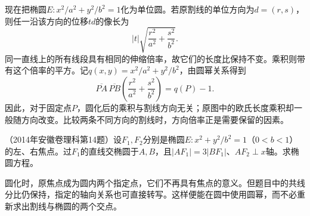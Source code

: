 现在把椭圆\(E:x^2/a^2+y^2/b^2=1\)化为单位圆。若原割线的单位方向为\(d=(r,s)\)，则任一沿该方向的位移\(t d\)的像长为
\begin{equation*}
    |t|\sqrt{\frac{r^2}{a^2}+\frac{s^2}{b^2}} .
\end{equation*}
同一直线上的所有线段具有相同的伸缩倍率，故它们的长度比保持不变。乘积则带有这个倍率的平方。记\(q(x,y)=x^2/a^2+y^2/b^2\)，由圆幂关系得到
\begin{equation}\label{eq:quadratic-ellipse-directional-power}
    \overline{PA}\,\overline{PB}
    \left(\frac{r^2}{a^2}+\frac{s^2}{b^2}\right)=q(P)-1 .
\end{equation}
因此，对于固定点\(P\)，圆化后的乘积与割线方向无关；原图中的欧氏长度乘积却一般随方向改变。比较两条不同方向的割线时，方向倍率正是需要保留的因素。

\begin{samepage}
\begin{example}\label{ex:quadratic-affine-focal-power}
（2014年安徽卷理科第14题）设\(F_1,F_2\)分别是椭圆\(E:x^2+y^2/b^2=1\)（\(0<b<1\)）的左、右焦点。过\(F_1\)的直线交椭圆于\(A,B\)，且\(|AF_1|=3|BF_1|\)、\(AF_2\perp x\)轴。求椭圆方程。
\end{example}
\end{samepage}

圆化时，原焦点成为圆内两个指定点，它们不再具有焦点的意义。但题目中的共线分比仍保持，指定的轴向关系也可直接转写。这样便能在圆中使用圆幂，而不必重新求出割线与椭圆的两个交点。

